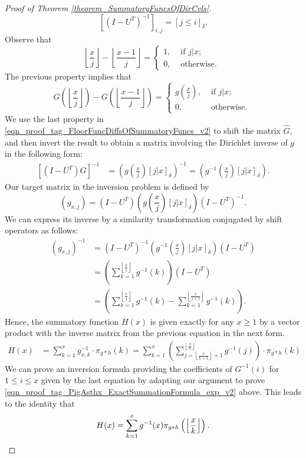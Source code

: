 \documentclass[11pt,reqno,a4letter]{article}
\numberwithin{figure}{section}
\numberwithin{table}{section}
\newcommand{\Iverson}[1]{\ensuremath{\left[#1\right]_{\delta}}}
\newcommand{\floor}[1]{\left\lfloor #1 \right\rfloor}
\newcommand{\Floor}[2]{\ensuremath{\left\lfloor \frac{#1}{#2} \right\rfloor}}
\theoremstyle{plain}
\numberwithin{theorem}{section}
\theoremstyle{definition}
\begin{document}
\begin{proof}[Proof of Theorem \ref{theorem_SummatoryFuncsOfDirCvls}]
\[
\left[(I - U^T)^{-1}\right]_{i,j} = \Iverson{j \leq i}. 
\]
Observe that 
\[
\Floor{x}{j} - \Floor{x-1}{j} = \begin{cases} 
     1, & \text{ if $j|x$; } \\ 
     0, & \text{ otherwise. } 
     \end{cases} 
\] 
The previous property implies that 
\begin{equation} 
\label{eqn_proof_tag_FloorFuncDiffsOfSummatoryFuncs_v2} 
G\left(\floor{\frac{x}{j}}\right) - G\left(\floor{\frac{x-1}{j}}\right) = 
     \begin{cases} 
     g\left(\frac{x}{j}\right), & \text{ if $j | x$; } \\ 
     0, & \text{ otherwise. } 
     \end{cases}
\end{equation} 
We use the last property in \eqref{eqn_proof_tag_FloorFuncDiffsOfSummatoryFuncs_v2} 
to shift the matrix $\hat{G}$, and then invert the result to obtain a matrix involving the 
Dirichlet inverse of $g$ in the following form: 
\begin{align*} 
\left[(I-U^{T}) \hat{G}\right]^{-1} & = \left(g\left(\frac{x}{j}\right) \Iverson{j|x}\right)^{-1} = 
     \left(g^{-1}\left(\frac{x}{j}\right) \Iverson{j|x}\right). 
\end{align*} 
Our target matrix in the inversion problem is defined by 
$$(g_{x,j}) = (I-U^{T}) \left(g\left(\frac{x}{j}\right) \Iverson{j|x}\right) (I-U^{T})^{-1}.$$
We can express its inverse by a similarity transformation conjugated by shift operators as follows: 
\begin{align*} 
(g_{x,j})^{-1} & = (I-U^{T})^{-1} \left(g^{-1}\left(\frac{x}{j}\right) \Iverson{j|x}\right) (I-U^{T}) \\ 
     & = \left(\sum_{k=1}^{\floor{\frac{x}{j}}} g^{-1}(k)\right) (I-U^{T}) \\ 
     & = \left(\sum_{k=1}^{\floor{\frac{x}{j}}} g^{-1}(k) - \sum_{k=1}^{\floor{\frac{x}{j+1}}} g^{-1}(k)\right). 
\end{align*} 
Hence, the summatory function $H(x)$ is given exactly for any $x \geq 1$ 
by a vector product with the inverse matrix from the previous equation in the next form. 
\begin{align*} 
H(x) & = \sum_{k=1}^x g_{x,k}^{-1} \cdot \pi_{g \ast h}(k) 
     = \sum_{k=1}^x \left(\sum_{j=\floor{\frac{x}{k+1}}+1}^{\floor{\frac{x}{k}}} g^{-1}(j)\right) 
     \cdot \pi_{g \ast h}(k) 
\end{align*} 
We can prove an inversion formula providing the coefficients of $G^{-1}(i)$ for $1 \leq i \leq x$ given 
by the last equation by adapting our argument to prove 
\eqref{eqn_proof_tag_PigAsthx_ExactSummationFormula_exp_v2} above. 
This leads to the identity that 
\[
H(x) = \sum_{k=1}^{x} g^{-1}(x) \pi_{g \ast h}\left(\Floor{x}{k}\right). 
     \qedhere 
\]
\end{proof} 
\end{document}

